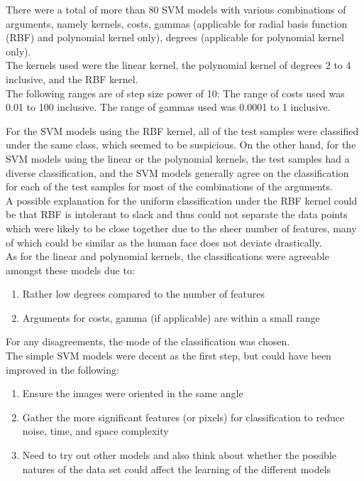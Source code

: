 \documentclass{article}
\begin{document}
There were a total of more than 80 SVM models with various combinations of arguments, namely kernels, costs, gammas (applicable for radial basis function (RBF) and polynomial kernel only), degrees (applicable for polynomial kernel only). \\

The kernels used were the linear kernel, the polynomial kernel of degrees 2 to 4 inclusive, and the RBF kernel. \\

The following ranges are of step size power of 10: The range of costs used was 0.01 to 100 inclusive. The range of gammas used was 0.0001 to 1 inclusive.

For the SVM models using the RBF kernel, all of the test samples were classified under the same class, which seemed to be suspicious. On the other hand, for the SVM models using the linear or the polynomial kernels, the test samples had a diverse classification, and the SVM models generally agree on the classification for each of the test samples for most of the combinations of the arguments. \\

A possible explanation for the uniform classification under the RBF kernel could be that RBF is intolerant to slack \cite{bib-01} and thus could not separate the data points which were likely to be close together due to the sheer number of features, many of which could be similar as the human face does not deviate drastically. \\

As for the linear and polynomial kernels, the classifications were agreeable amongst these models due to:
\begin{enumerate}
	\item Rather low degrees compared to the number of features
	\item Arguments for costs, gamma (if applicable) are within a small range
\end{enumerate}

For any disagreements, the mode of the classification was chosen. \\

The simple SVM models were decent as the first step, but could have been improved in the following:
\begin{enumerate}
	\item Ensure the images were oriented in the same angle
	\item Gather the more significant features (or pixels) for classification to reduce noise, time, and space complexity
	\item Need to try out other models and also think about whether the possible natures of the data set could affect the learning of the different models
\end{enumerate}
\end{document}
